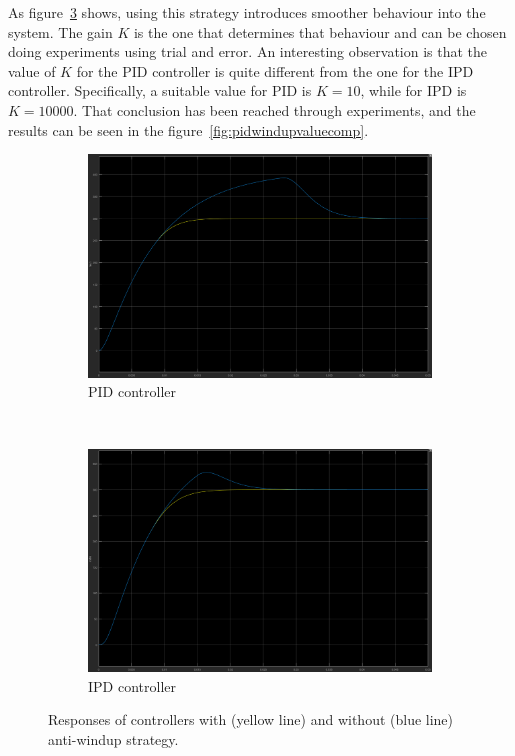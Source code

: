 As figure~\ref{fig:antiwindupresponses} shows, using this strategy introduces smoother behaviour into the system. The gain $K$ is the one that determines that behaviour and can be chosen doing experiments using trial and error. An interesting observation is that the value of $K$ for the PID controller is quite different from the one for the IPD controller. Specifically, a suitable value for PID is $K=10$, while for IPD is $K=10000$. That conclusion has been reached through experiments, and the results can be seen in the figure~\ref{fig:pidwindupvaluecomp}.

\begin{figure}
	\centering
	\begin{subfigure}[b]{0.45\textwidth}
		\includegraphics[width=\textwidth]{graphics/pidwindupresponse}
		\caption{PID controller}
		\label{fig:pidwindupresponse}
	\end{subfigure}
	~ %
	\begin{subfigure}[b]{0.45\textwidth}
		\includegraphics[width=\textwidth]{graphics/ipdwindupresponse}
		\caption{IPD controller}
		\label{fig:ipdwindupresponse}
	\end{subfigure}
	\caption{Responses of controllers with (yellow line) and without (blue line) anti-windup strategy.}\label{fig:antiwindupresponses}
\end{figure}


